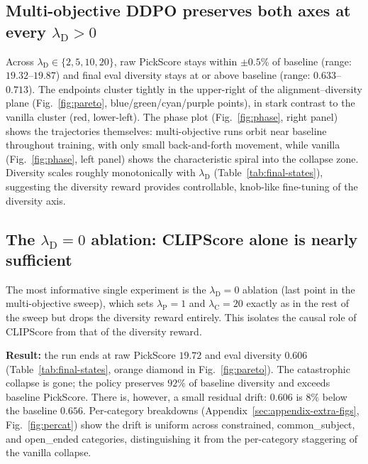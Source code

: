 \documentclass[10pt,letterpaper]{article}
\newcommand{\lambdaP}{\lambda_{\mathrm{P}}}
\newcommand{\lambdaC}{\lambda_{\mathrm{C}}}
\newcommand{\lambdaD}{\lambda_{\mathrm{D}}}
\begin{document}
\subsection{Multi-objective DDPO preserves both axes at every $\lambdaD > 0$}
\label{sec:results-multiobj}

Across $\lambdaD \in \{2, 5, 10, 20\}$, raw PickScore stays within ${\pm}0.5\%$ of baseline (range: $19.32$--$19.87$) and final eval diversity stays at or above baseline (range: $0.633$--$0.713$). The endpoints cluster tightly in the upper-right of the alignment--diversity plane (Fig.~\ref{fig:pareto}, blue/green/cyan/purple points), in stark contrast to the vanilla cluster (red, lower-left). The phase plot (Fig.~\ref{fig:phase}, right panel) shows the trajectories themselves: multi-objective runs orbit near baseline throughout training, with only small back-and-forth movement, while vanilla (Fig.~\ref{fig:phase}, left panel) shows the characteristic spiral into the collapse zone. Diversity scales roughly monotonically with $\lambdaD$ (Table~\ref{tab:final-states}), suggesting the diversity reward provides controllable, knob-like fine-tuning of the diversity axis.

\subsection{The $\lambdaD{=}0$ ablation: CLIPScore alone is nearly sufficient}
\label{sec:results-ablation}

The most informative single experiment is the $\lambdaD{=}0$ ablation (last point in the multi-objective sweep), which sets $\lambdaP = 1$ and $\lambdaC = 20$ exactly as in the rest of the sweep but drops the diversity reward entirely. This isolates the causal role of CLIPScore from that of the diversity reward.

\textbf{Result:} the run ends at raw PickScore $19.72$ and eval diversity $0.606$ (Table~\ref{tab:final-states}, orange diamond in Fig.~\ref{fig:pareto}). The catastrophic collapse is gone; the policy preserves $92\%$ of baseline diversity and exceeds baseline PickScore. There is, however, a small residual drift: $0.606$ is $8\%$ below the baseline $0.656$. Per-category breakdowns (Appendix~\ref{sec:appendix-extra-figs}, Fig.~\ref{fig:percat}) show the drift is uniform across constrained, common\_subject, and open\_ended categories, distinguishing it from the per-category staggering of the vanilla collapse.
\end{document}

